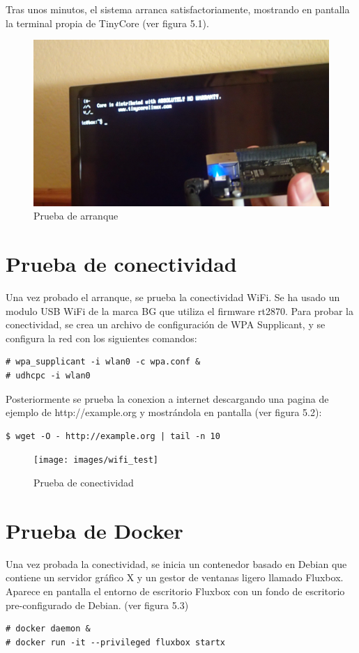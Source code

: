 \documentclass{tfg}
\begin{document}
Tras unos minutos, el sistema arranca satisfactoriamente, mostrando en pantalla la terminal propia de TinyCore (ver figura 5.1).
\begin{figure}[hb]
	\centering
	\includegraphics[scale=0.4]{images/boot_test}
	\caption{Prueba de arranque}
\end{figure}

\section{Prueba de conectividad}
Una vez probado el arranque, se prueba la conectividad WiFi. Se ha usado un modulo USB WiFi de la marca BG que utiliza el firmware rt2870.
Para probar la conectividad, se crea un archivo de configuración de WPA Supplicant, y se configura la red con los siguientes comandos:
\begin{lstlisting}[caption=Configuración de red]
# wpa_supplicant -i wlan0 -c wpa.conf &
# udhcpc -i wlan0
\end{lstlisting}

Posteriormente se prueba la conexion a internet descargando una pagina de ejemplo de http://example.org y mostrándola en pantalla (ver figura 5.2):
\begin{lstlisting}[caption=Configuración de red]
$ wget -O - http://example.org | tail -n 10
\end{lstlisting}
%

\begin{figure}[hb]
	\centering
	\texttt{[image: images/wifi\_test]}
	\caption{Prueba de conectividad}
\end{figure}

\section{Prueba de Docker}
Una vez probada la conectividad, se inicia un contenedor basado en Debian que contiene un servidor gráfico X y un gestor de ventanas ligero llamado Fluxbox. Aparece en pantalla el entorno de escritorio Fluxbox con un fondo de escritorio pre-configurado de Debian. (ver figura 5.3)
\begin{lstlisting}[caption=Inicio del contenedor]
# docker daemon &
# docker run -it --privileged fluxbox startx
\end{lstlisting}
\end{document}

